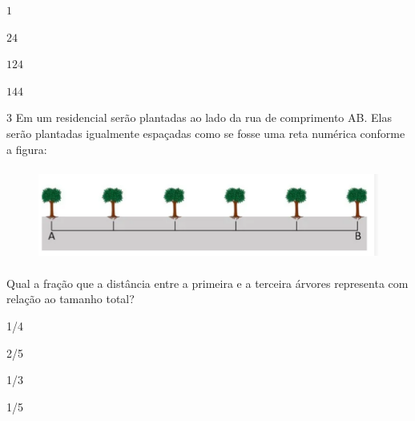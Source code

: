 \begin{escolha}
\item $1$
\item $24$
\item $124$
\item $144$
\end{escolha}



\num{3}  Em um residencial serão plantadas ao lado da rua de comprimento AB.
Elas serão plantadas igualmente espaçadas como se fosse uma reta
numérica conforme a figura:


\begin{figure}
\centering\includegraphics[width=5in,height=1.19792in]{./imgSAEB_6_MAT/media/image109.png}
\end{figure}

Qual a fração que a distância entre a primeira e a terceira árvores
representa com relação ao tamanho total?

\begin{escolha}
\item 1/4
\item 2/5
\item 1/3
\item 1/5
\end{escolha}

